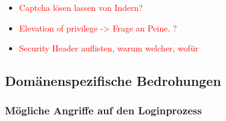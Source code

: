 \documentclass[12pt,DIV14,BCOR10mm,a4paper,twoside,parskip=half-,headsepline,headinclude,english,ngerman,bibliography=totocnumbered]{scrreprt}
\begin{document}
\begin{itemize}
  \item \textcolor{red}{Captcha lösen lassen von Indern?}
  \item \textcolor{red}{Elevation of privilege -> Frage an Peine. ?}
  \item \textcolor{red}{Security Header auflisten, warum welcher, wofür}
\end{itemize}

\subsection{Domänenspezifische Bedrohungen}

\subsubsection{Mögliche Angriffe auf den Loginprozess}
\end{document}
